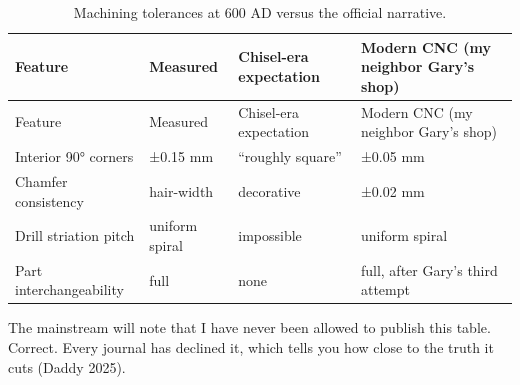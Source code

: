 \documentclass[
  english,
  11pt,
  letterpaper,
]{scrbook}
\newcounter{none} %
\begin{document}
\begin{longtable}[]{@{}
  >{\raggedright\arraybackslash}p{}
  >{\raggedright\arraybackslash}p{}
  >{\raggedright\arraybackslash}p{}
  >{\raggedright\arraybackslash}p{}@{}}
\caption{Machining tolerances at 600 AD versus the official
narrative.}\label{tbl-tolerances}\tabularnewline
\toprule\noalign{}
\begin{minipage}[b]{\linewidth}\raggedright
Feature
\end{minipage} & \begin{minipage}[b]{\linewidth}\raggedright
Measured
\end{minipage} & \begin{minipage}[b]{\linewidth}\raggedright
Chisel-era expectation
\end{minipage} & \begin{minipage}[b]{\linewidth}\raggedright
Modern CNC (my neighbor Gary's shop)
\end{minipage} \\
\midrule\noalign{}
\endfirsthead
\toprule\noalign{}
\begin{minipage}[b]{\linewidth}\raggedright
Feature
\end{minipage} & \begin{minipage}[b]{\linewidth}\raggedright
Measured
\end{minipage} & \begin{minipage}[b]{\linewidth}\raggedright
Chisel-era expectation
\end{minipage} & \begin{minipage}[b]{\linewidth}\raggedright
Modern CNC (my neighbor Gary's shop)
\end{minipage} \\
\midrule\noalign{}
\endhead
\bottomrule\noalign{}
\endlastfoot
Interior 90° corners & ±0.15 mm & ``roughly square'' & ±0.05 mm \\
Chamfer consistency & hair-width & decorative & ±0.02 mm \\
Drill striation pitch & uniform spiral & impossible & uniform spiral \\
Part interchangeability & full & none & full, after Gary's third
attempt \\
\end{longtable}

The mainstream will note that I have never been allowed to publish this
table. Correct. Every journal has declined it, which tells you how close
to the truth it cuts (Daddy 2025).
\end{document}
